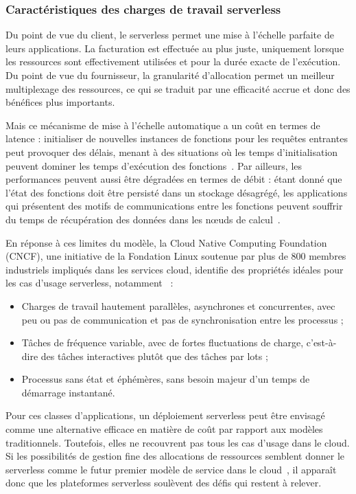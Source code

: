 \subsubsection{Caractéristiques des charges de travail serverless}

Du point de vue du client, le serverless permet une mise à l'échelle parfaite de leurs applications. La facturation est effectuée au plus juste, uniquement lorsque les ressources sont effectivement utilisées et pour la durée exacte de l'exécution. Du point de vue du fournisseur, la granularité d'allocation permet un meilleur multiplexage des ressources, ce qui se traduit par une efficacité accrue et donc des bénéfices plus importants.

Mais ce mécanisme de mise à l'échelle automatique a un coût en termes de latence : initialiser de nouvelles instances de fonctions pour les requêtes entrantes peut provoquer des délais, menant à des situations où les temps d'initialisation peuvent dominer les temps d'exécution des fonctions~\cite{Jiang2021TowardsDS}. Par ailleurs, les performances peuvent aussi être dégradées en termes de débit : étant donné que l'état des fonctions doit être persisté dans un stockage désagrégé, les applications qui présentent des motifs de communications entre les fonctions peuvent souffrir du temps de récupération des données dans les nœuds de calcul~\cite{mullerLambadaInteractiveData2020}.

En réponse à ces limites du modèle, la Cloud Native Computing Foundation (\gls{CNCF}), une initiative de la Fondation Linux soutenue par plus de 800 membres industriels impliqués dans les services cloud, identifie des propriétés idéales pour les cas d'usage serverless, notamment~\cite{cncf2018whitepaper} :

\begin{itemize}
    \item Charges de travail hautement parallèles, asynchrones et concurrentes, avec peu ou pas de communication et pas de synchronisation entre les processus ;
    \item Tâches de fréquence variable, avec de fortes fluctuations de charge, c'est-à-dire des tâches interactives plutôt que des tâches par lots ;
    \item Processus sans état et éphémères, sans besoin majeur d'un temps de démarrage instantané.
\end{itemize}

Pour ces classes d'applications, un déploiement serverless peut être envisagé comme une alternative efficace en matière de coût par rapport aux modèles traditionnels. Toutefois, elles ne recouvrent pas tous les cas d'usage dans le cloud. Si les possibilités de gestion fine des allocations de ressources semblent donner le serverless comme le futur premier modèle de service dans le cloud~\cite{hellersteinServerlessComputingOne2019}, il apparaît donc que les plateformes serverless soulèvent des défis qui restent à relever.

